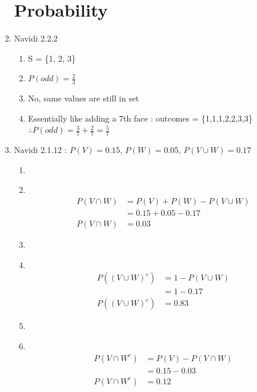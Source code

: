 \documentclass[11pt]{article}
\newcommand\Item[1][]{%
  \ifx\relax#1\relax  \item \else \item[#1] \fi
  \abovedisplayskip=0pt\abovedisplayshortskip=0pt~\vspace*{-\baselineskip}}
\begin{document}
\begin{enumerate}
\section*{Probability}
        \item Navidi 2.2.2
        \begin{enumerate}
                \item S = \{1, 2, 3\}
                \item $P(odd) = \frac{2}{3}$
                \item No, same values are still in set
                \item Essentially like adding a 7th face : outcomes = \{1,1,1,2,2,3,3\}  \\
                      $\therefore P(odd) = \frac{3}{7} + \frac{2}{7} = \frac{5}{7}$ 
        \end{enumerate}
        \item Navidi 2.1.12 : $P(V) = 0.15$, $P(W) = 0.05$, $P(V \cup W) = 0.17$
        \begin{enumerate}
                \Item
                \begin{align*}
                        P(V \cap W) &= P(V) + P(W) - P(V \cup W) \\
                        &= 0.15 + 0.05 - 0.17 \\
                        P(V \cap W) &= 0.03
                \end{align*}
                \Item
                \begin{align*}
                        P((V \cup W)^{c}) &= 1 - P(V \cup W)\\
                        &= 1 - 0.17 \\
                        P((V \cup W)^{c}) &= 0.83
                \end{align*}
                \Item
                \begin{align*}
                        P(V \cap W^{c}) &= P(V) - P(V \cap W)\\
                        &= 0.15 - 0.03 \\
                        P(V \cap W^{c}) &= 0.12
                \end{align*}
        \end{enumerate}
\end{enumerate}
\end{document}
